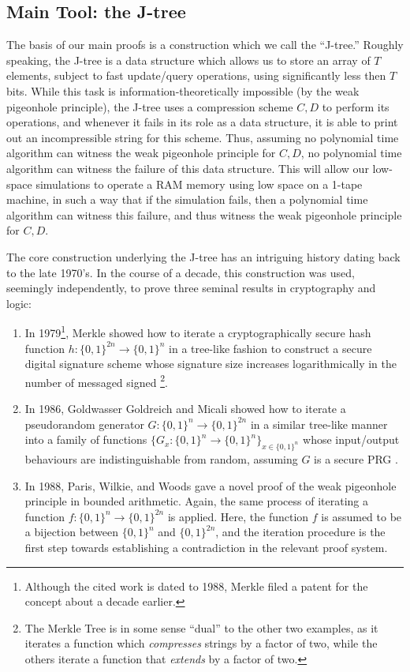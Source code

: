 \documentclass[11pt]{article}
\newcommand{\B}{\{0,1\}}
\begin{document}
\subsection{Main Tool: the J-tree}
The basis of our main proofs is a construction which we call the ``J-tree.'' Roughly speaking, the J-tree is a data structure which allows us to store an array of $T$ elements, subject to fast update/query operations, using significantly less then $T$ bits. While this task is information-theoretically impossible (by the weak pigeonhole principle), the J-tree uses a compression scheme $C,D$ to perform its operations, and whenever it fails in its role as a data structure, it is able to print out an incompressible string for this scheme. Thus, assuming no polynomial time algorithm can witness the weak pigeonhole principle for $C,D$, no polynomial time algorithm can witness the failure of this data structure. This will allow our low-space simulations to operate a RAM memory using low space on a 1-tape machine, in such a way that if the simulation fails, then a polynomial time algorithm can witness this failure, and thus witness the weak pigeonhole principle for $C,D$.

The core construction underlying the J-tree has an intriguing history dating back to the late 1970's. In the course of a decade, this construction was used, seemingly independently, to prove three seminal results in cryptography and logic: 
\begin{enumerate}
    \item In 1979\footnote{Although the cited work is dated to 1988, Merkle filed a patent for the concept about a decade earlier.}, Merkle showed how to iterate a cryptographically secure hash function $h\colon \B^{2n} \rightarrow \B^n$ in a tree-like fashion to construct a secure digital signature scheme whose signature size increases logarithmically in the number of messaged signed \cite{Merkle}\footnote{The Merkle Tree is in some sense ``dual'' to the other two examples, as it iterates a function which \emph{compresses} strings by a factor of two, while the others iterate a function that \emph{extends} by a factor of two.}.
    \item In 1986, Goldwasser Goldreich and Micali showed how to iterate a pseudorandom generator $G\colon \B^n \rightarrow \B^{2n}$ in a similar tree-like manner into a family of functions $\{G_x\colon \B^n \rightarrow \B^n\}_{x \in \B^n}$ whose input/output behaviours are indistinguishable from random, assuming $G$ is a secure PRG \cite{GGM}.
    \item In 1988, Paris, Wilkie, and Woods gave a novel proof of the weak pigeonhole principle in bounded arithmetic\cite{Paris-Wilkie-Woods}. Again, the same process of iterating a function $f\colon \B^n \rightarrow \B^{2n}$ is applied. Here, the function $f$ is assumed to be a bijection between $\B^n$ and $\B^{2n}$, and the iteration procedure is the first step towards establishing a contradiction in the relevant proof system.
\end{enumerate}
\end{document}
